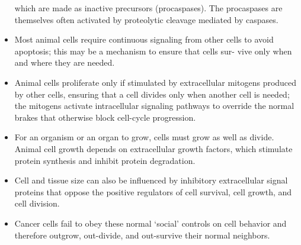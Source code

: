 \begin{itemize}
which are made as inactive precursors (procaspases). The
procaspases are themselves often activated by proteolytic cleavage
mediated by caspases.
\item Most animal cells require continuous signaling from other cells to
avoid apoptosis; this may be a mechanism to ensure that cells sur-
vive only when and where they are needed.
\item Animal cells proliferate only if stimulated by extracellular mitogens
produced by other cells, ensuring that a cell divides only when
another cell is needed; the mitogens activate intracellular signaling
pathways to override the normal brakes that otherwise block cell-cycle
progression.
\item For an organism or an organ to grow, cells must grow as well as
divide. Animal cell growth depends on extracellular growth factors,
which stimulate protein synthesis and inhibit protein degradation.
\item Cell and tissue size can also be influenced by inhibitory extracellular
signal proteins that oppose the positive regulators of cell survival,
cell growth, and cell division.
\item Cancer cells fail to obey these normal ‘social’ controls on cell behavior
and therefore outgrow, out-divide, and out-survive their normal
neighbors.
\end{itemize}
